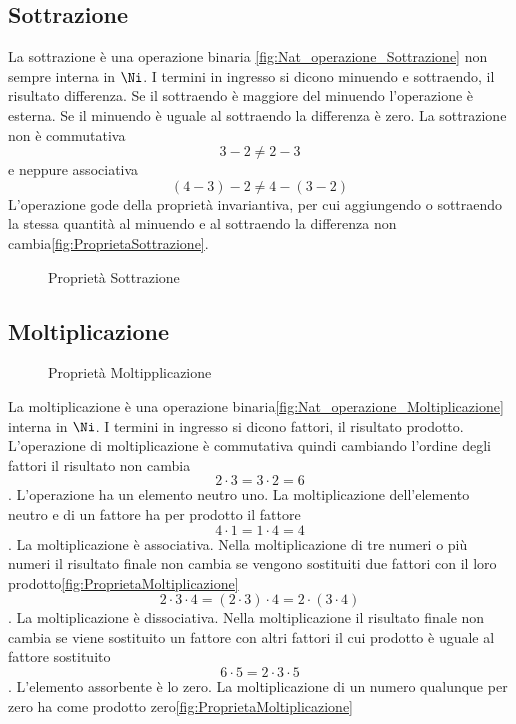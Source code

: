 \subsection{Sottrazione}
\label{sec:NumerinatDiff}
La sottrazione è una operazione binaria \nobs\vref{fig:Nat_operazione_Sottrazione} non sempre interna in $\Ni$. I termini in ingresso si dicono minuendo e sottraendo, il risultato differenza. Se il sottraendo è maggiore del minuendo l'operazione è esterna. Se il minuendo è uguale al sottraendo la differenza è zero. La sottrazione non è commutativa \[3-2\neq2-3\] e neppure associativa \[(4-3)-2\neq4-(3-2)\]
 L'operazione gode della proprietà invariantiva, per cui aggiungendo o sottraendo la stessa quantità al minuendo e al sottraendo la differenza non cambia\nobs\vref{fig:ProprietaSottrazione}.  
\begin{figure} %
	\centering

	\caption{Proprietà Sottrazione}
	\label{fig:ProprietaSottrazione}\end{figure}
\subsection{Moltiplicazione}
\label{sec:NumerinatMolt}
\begin{figure} %
	\centering

	\caption{Proprietà Moltipplicazione}
	\label{fig:ProprietaMoltiplicazione}\end{figure}
La moltiplicazione è una operazione binaria\nobs\vref{fig:Nat_operazione_Moltiplicazione}  interna in $\Ni$. I termini in ingresso si dicono fattori, il risultato prodotto. L'operazione di moltiplicazione  è commutativa quindi cambiando l'ordine degli fattori il risultato non cambia \[2\cdot3=3\cdot2=6\]. L'operazione ha un elemento neutro uno. La moltiplicazione dell'elemento neutro e di un fattore ha per prodotto il fattore  \[4\cdot1=1\cdot4=4\]. La moltiplicazione è associativa. Nella moltiplicazione di tre numeri o più numeri il risultato finale non cambia se vengono sostituiti due fattori con il loro prodotto\nobs\vref{fig:ProprietaMoltiplicazione} \[2\cdot3\cdot4=(2\cdot3)\cdot4=2\cdot(3\cdot4)\]. La moltiplicazione è dissociativa. Nella moltiplicazione  il risultato finale non cambia se viene sostituito un fattore con altri fattori il cui prodotto è uguale al fattore sostituito  \[6\cdot5=2\cdot3\cdot5\]. L'elemento assorbente è lo zero. La moltiplicazione di un numero qualunque per zero ha come prodotto zero\nobs\vref{fig:ProprietaMoltiplicazione}
